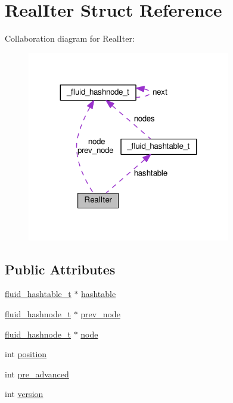 \hypertarget{structRealIter}{}\section{Real\+Iter Struct Reference}
\label{structRealIter}


Collaboration diagram for Real\+Iter\+:
\nopagebreak
\begin{figure}[H]
\begin{center}
\leavevmode
\includegraphics[width=251pt]{structRealIter__coll__graph}
\end{center}
\end{figure}
\subsection*{Public Attributes}
\begin{DoxyCompactItemize}
\item 
\hyperlink{fluidsynth__priv_8h_a6cd032fa96f8ec0d47a5ba1a96f2f6c9}{fluid\+\_\+hashtable\+\_\+t} $\ast$ \hyperlink{structRealIter_a9969f2dc848684a7d2286e511e34c748}{hashtable}
\item 
\hyperlink{fluid__hash_8h_a050a9781c9fa10e4b1caac67d32b9be4}{fluid\+\_\+hashnode\+\_\+t} $\ast$ \hyperlink{structRealIter_aa7a33aea03ac572d17ce4bb73f3e0f20}{prev\+\_\+node}
\item 
\hyperlink{fluid__hash_8h_a050a9781c9fa10e4b1caac67d32b9be4}{fluid\+\_\+hashnode\+\_\+t} $\ast$ \hyperlink{structRealIter_a629a219501f62b609cd0bfec3354f685}{node}
\item 
int \hyperlink{structRealIter_a4b829b7f6654f2b4ee9e573f23cf16c0}{position}
\item 
int \hyperlink{structRealIter_aa94eefc6f9bdc30932655eacf4e8b410}{pre\+\_\+advanced}
\item 
int \hyperlink{structRealIter_a78f441c77ed876e50454c192790b283c}{version}
\end{DoxyCompactItemize}


